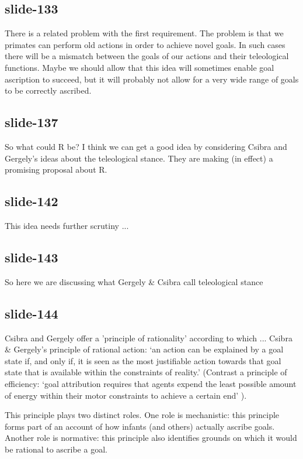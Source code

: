 \documentclass[12pt,\papersize]{extarticle}
\begin{document}
 
\subsection{slide-133}
There is a related problem with the first requirement. The problem is that we primates can perform old actions in order to achieve novel goals. In such cases there will be a mismatch between the goals of our actions and their teleological functions. Maybe we should allow that this idea will sometimes enable goal ascription to succeed, but it will probably not allow for a very wide range of goals to be correctly ascribed.
 
 
\subsection{slide-137}
So what could R be? I think we can get a good idea by considering Csibra and Gergely's ideas about the teleological stance. They are making (in effect) a promising proposal about R.
 
 
\subsection{slide-142}
This idea needs further scrutiny ...
 
 
\subsection{slide-143}
So here we are discussing what Gergely \& Csibra call teleological stance
 
 
\subsection{slide-144}
Csibra and Gergely offer a 'principle of rationality' according to which ...
Csibra \& Gergely's principle of rational action: `an action can be explained by a goal state if, and only if, it is seen as the most justifiable action towards that goal state that is available within the constraints of reality.'\citep{Csibra:1998cx,Csibra:2003jv}
(Contrast a principle of efficiency: `goal attribution requires that agents expend the least possible amount of energy within their motor constraints to achieve a certain end' \citep[p.\ 1061]{Southgate:2008el}).
 
This principle plays two distinct roles.
One role is mechanistic: this principle forms part of an account of how infants (and others) actually ascribe goals.
Another role is normative: this principle also identifies grounds on which it would be rational to ascribe a goal.
 
\end{document}
